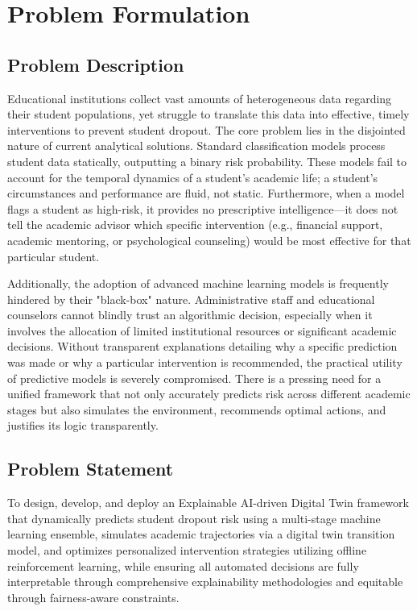 \documentclass[12pt,a4paper]{report}
\begin{document}
\chapter{Problem Formulation}

\section{Problem Description}
Educational institutions collect vast amounts of heterogeneous data regarding their student populations, yet struggle to translate this data into effective, timely interventions to prevent student dropout. The core problem lies in the disjointed nature of current analytical solutions. Standard classification models process student data statically, outputting a binary risk probability. These models fail to account for the temporal dynamics of a student's academic life; a student's circumstances and performance are fluid, not static. Furthermore, when a model flags a student as high-risk, it provides no prescriptive intelligence—it does not tell the academic advisor which specific intervention (e.g., financial support, academic mentoring, or psychological counseling) would be most effective for that particular student. 

Additionally, the adoption of advanced machine learning models is frequently hindered by their "black-box" nature. Administrative staff and educational counselors cannot blindly trust an algorithmic decision, especially when it involves the allocation of limited institutional resources or significant academic decisions. Without transparent explanations detailing why a specific prediction was made or why a particular intervention is recommended, the practical utility of predictive models is severely compromised. There is a pressing need for a unified framework that not only accurately predicts risk across different academic stages but also simulates the environment, recommends optimal actions, and justifies its logic transparently.

\section{Problem Statement}
To design, develop, and deploy an Explainable AI-driven Digital Twin framework that dynamically predicts student dropout risk using a multi-stage machine learning ensemble, simulates academic trajectories via a digital twin transition model, and optimizes personalized intervention strategies utilizing offline reinforcement learning, while ensuring all automated decisions are fully interpretable through comprehensive explainability methodologies and equitable through fairness-aware constraints.
\end{document}
